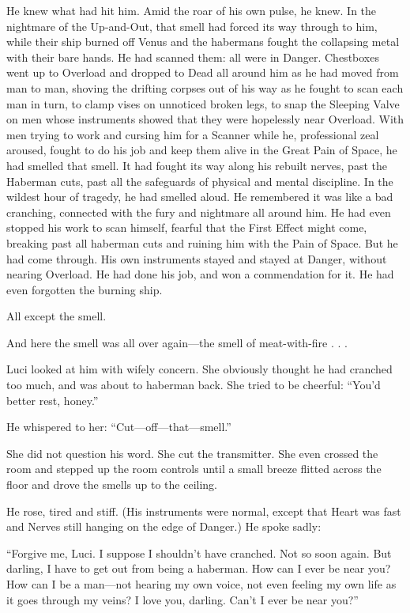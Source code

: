 He knew what had hit him. Amid the roar of his own pulse, he knew. In the nightmare of the Up-and-Out, that smell had forced its way through to him, while their ship burned off Venus and the habermans fought the collapsing metal with their bare hands. He had scanned them: all were in Danger. Chestboxes went up to Overload and dropped to Dead all around him as he had moved from man to man, shoving the drifting corpses out of his way as he fought to scan each man in turn, to clamp vises on unnoticed broken legs, to snap the Sleeping Valve on men whose instruments showed that they were hopelessly near Overload. With men trying to work and cursing him for a Scanner while he, professional zeal aroused, fought to do his job and keep them alive in the Great Pain of Space, he had smelled that smell. It had fought its way along his rebuilt nerves, past the Haberman cuts, past all the safeguards of physical and mental discipline. In the wildest hour of tragedy, he had smelled aloud. He remembered it was like a bad cranching, connected with the fury and nightmare all around him. He had even stopped his work to scan himself, fearful that the First Effect might come, breaking past all haberman cuts and ruining him with the Pain of Space. But he had come through. His own instruments stayed and stayed at Danger, without nearing Overload. He had done his job, and won a commendation for it. He had even forgotten the burning ship.

All except the smell.

And here the smell was all over again---the smell of meat-with-fire . . .

Luci looked at him with wifely concern. She obviously thought he had cranched too much, and was about to haberman back. She tried to be cheerful: ``You'd better rest, honey.''

He whispered to her: ``Cut---off---that---smell.''

She did not question his word. She cut the transmitter. She even crossed the room and stepped up the room controls until a small breeze flitted across the floor and drove the smells up to the ceiling.

He rose, tired and stiff. (His instruments were normal, except that Heart was fast and Nerves still hanging on the edge of Danger.) He spoke sadly:

``Forgive me, Luci. I suppose I shouldn't have cranched. Not so soon again. But darling, I have to get out from being a haberman. How can I ever be near you? How can I be a man---not hearing my own voice, not even feeling my own life as it goes through my veins? I love you, darling. Can't I ever be near you?''

